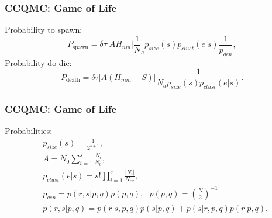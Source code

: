 \documentclass{beamer}
\begin{document}
\begin{frame}
\frametitle{CCQMC: Game of Life}
Probability to spawn:
\begin{equation*}
P_{\text{spawn}} =\delta \tau |A H_{nm}| \frac{1}N_a p_{size}(s) p_{clust} (e|s)\frac{1}{p_{gen}},
\end{equation*}
Probability do die:
\begin{equation*}
P_{\text{death}} = \delta \tau | A (H_{mm}-S) | \frac{1}{N_a p_{size}(s) p_{clust} (e|s)} .
\end{equation*}
\end{frame}

\begin{frame}
\frametitle{CCQMC: Game of Life}
Probabilities:
\begin{align*}
&p_{size}(s)=\frac{1}{2^{s+1}},\\
&A = N_0 \sum_{i=1}^{s} \frac{N_i}{N_0}, \\
&p_{clust} (e|s)=s! \prod_{i=1}^{s}\frac{|N_i|}{N_{ex}},\\
&p_{gen}=p(r,s|p,q)p(p,q), \ \ \ p(p,q) = \binom{N}{2}^{-1}\\
&p(r,s|p,q)=p(r|s, p,q)p(s|p,q) + p(s|r, p,q)p(r|p,q).
\end{align*}
\end{frame}
\end{document}
